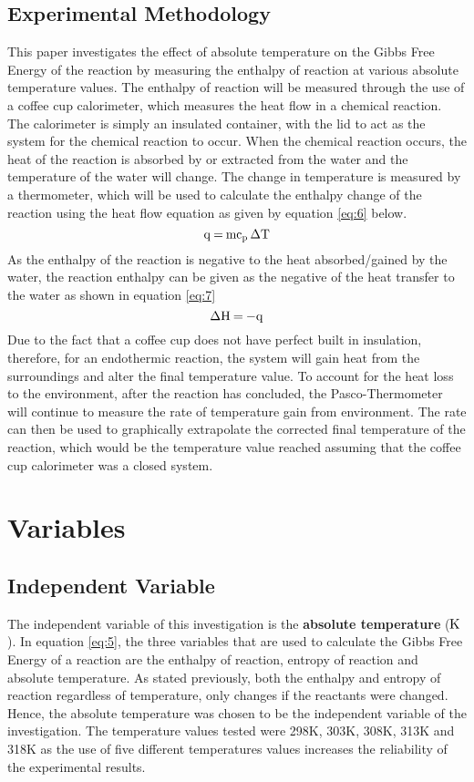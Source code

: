 \documentclass{article}
\begin{document}
\subsection{Experimental Methodology}
This paper investigates the effect of absolute temperature on the Gibbs Free Energy of the reaction by measuring the enthalpy of reaction at various absolute temperature values. The enthalpy of reaction will be measured through the use of a coffee cup calorimeter, which measures the heat flow in a chemical reaction. The calorimeter is simply an insulated container, with the lid to act as the system for the chemical reaction to occur. When the chemical reaction occurs, the heat of the reaction is absorbed by or extracted from the water and the temperature of the water will change. The change in temperature is measured by a thermometer, which will be used to calculate the enthalpy change of the reaction using the heat flow equation as given by equation \ref{eq:6} below.
\begin{equation}
\ce{q = mc_{\mathrm{p}} \Delta T} \label{eq:6} 
\end{equation}
As the enthalpy of the reaction is negative to the heat absorbed/gained by the water, the reaction enthalpy can be given as the negative of the heat transfer to the water as shown in equation \ref{eq:7}
\begin{equation}
\ce{\Delta H = -q} \label{eq:7}
\end{equation}
Due to the fact that a coffee cup does not have perfect built in insulation, therefore, for an endothermic reaction, the system will gain heat from the surroundings and alter the final temperature value. To account for the heat loss to the environment, after the reaction has concluded, the Pasco-Thermometer will continue to measure the rate of temperature gain from environment. The rate can then be used to graphically extrapolate the corrected final temperature of the reaction, which would be the temperature value reached assuming that the coffee cup calorimeter was a closed system. 

\section{Variables}
\subsection{Independent Variable}
The independent variable of this investigation is the \textbf{absolute temperature }($\ce{K}$). In equation \ref{eq:5}, the three variables that are used to calculate the Gibbs Free Energy of a reaction are the enthalpy of reaction, entropy of reaction and absolute temperature. As stated previously, both the enthalpy and entropy of reaction regardless of temperature, only changes if the reactants were changed. Hence, the absolute temperature was chosen to be the independent variable of the investigation. The temperature values tested were 298K, 303K, 308K, 313K and 318K as the use of five different temperatures values increases the reliability of the experimental results. 
\end{document}
